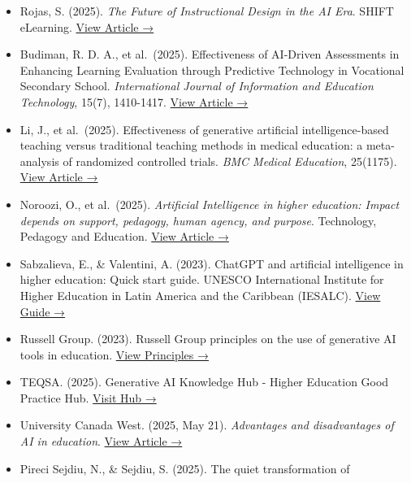 \documentclass[
  11pt,
  letterpaper,
  DIV=11,
  numbers=noendperiod]{scrartcl}
\begin{document}
\begin{itemize}
{  Report →}
\item
  Rojas, S. (2025). \emph{The Future of Instructional Design in the AI
  Era}. SHIFT eLearning.
  \href{https://www.shiftelearning.com/blog/future-instructional-design-ai-era}{View
  Article →}
\item
  Budiman, R. D. A., et al.~(2025). Effectiveness of AI-Driven
  Assessments in Enhancing Learning Evaluation through Predictive
  Technology in Vocational Secondary School. \emph{International Journal
  of Information and Education Technology}, 15(7), 1410-1417.
  \href{https://www.ijiet.org/vol15/IJIET-V15N7-2342.pdf}{View Article
  →}
\item
  Li, J., et al.~(2025). Effectiveness of generative artificial
  intelligence-based teaching versus traditional teaching methods in
  medical education: a meta-analysis of randomized controlled trials.
  \emph{BMC Medical Education}, 25(1175).
  \href{https://pmc.ncbi.nlm.nih.gov/articles/PMC12362899/pdf/12909_2025_Article_7750.pdf}{View
  Article →}
\item
  Noroozi, O., et al.~(2025). \emph{Artificial Intelligence in higher
  education: Impact depends on support, pedagogy, human agency, and
  purpose}. Technology, Pedagogy and Education.
  \href{https://www.tandfonline.com/doi/full/10.1080/14703297.2025.2539579}{View
  Article →}
\item
  Sabzalieva, E., \& Valentini, A. (2023). ChatGPT and artificial
  intelligence in higher education: Quick start guide. UNESCO
  International Institute for Higher Education in Latin America and the
  Caribbean (IESALC).
  \href{https://unesdoc.unesco.org/ark:/48223/pf0000385146}{View Guide
  →}
\item
  Russell Group. (2023). Russell Group principles on the use of
  generative AI tools in education.
  \href{https://www.russellgroup.ac.uk/policy/policy-briefings/principles-use-generative-ai-tools-education}{View
  Principles →}
\item
  TEQSA. (2025). Generative AI Knowledge Hub - Higher Education Good
  Practice Hub.
  \href{https://www.teqsa.gov.au/guides-resources/higher-education-good-practice-hub/gen-ai-knowledge-hub}{Visit
  Hub →}
\item
  University Canada West. (2025, May 21). \emph{Advantages and
  disadvantages of AI in education}.
  \href{https://www.ucanwest.ca/blog/education-careers-tips/advantages-and-disadvantages-of-ai-in-education}{View
  Article →}
\item
  Pireci Sejdiu, N., \& Sejdiu, S. (2025). The quiet transformation of

\end{itemize}
\end{document}
